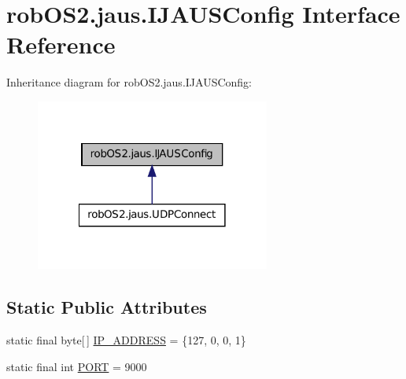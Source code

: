 \hypertarget{interfacerob_o_s2_1_1jaus_1_1_i_j_a_u_s_config}{
\section{robOS2.jaus.IJAUSConfig Interface Reference}
\label{interfacerob_o_s2_1_1jaus_1_1_i_j_a_u_s_config}
}


Inheritance diagram for robOS2.jaus.IJAUSConfig:\nopagebreak
\begin{figure}[H]
\begin{center}
\leavevmode
\includegraphics[width=218pt]{interfacerob_o_s2_1_1jaus_1_1_i_j_a_u_s_config__inherit__graph}
\end{center}
\end{figure}
\subsection*{Static Public Attributes}
\begin{DoxyCompactItemize}
\item 
static final byte\mbox{[}$\,$\mbox{]} \hyperlink{interfacerob_o_s2_1_1jaus_1_1_i_j_a_u_s_config_a19c69476ca2c0cac980e6a36b01dd236}{IP\_\-ADDRESS} = \{127, 0, 0, 1\}
\item 
static final int \hyperlink{interfacerob_o_s2_1_1jaus_1_1_i_j_a_u_s_config_a8e37b52931fe576a44a7882d3b4f5c53}{PORT} = 9000
\end{DoxyCompactItemize}


